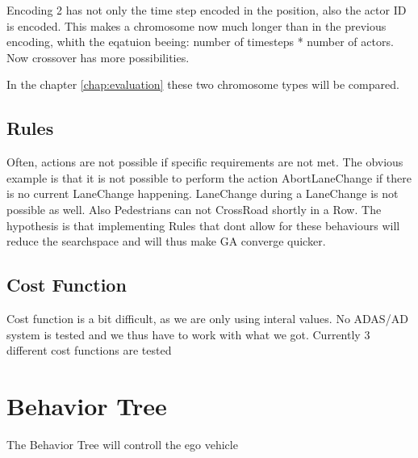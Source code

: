 Encoding 2 has not only the time step encoded in the position, also the actor ID is encoded. This makes a chromosome now much longer than in the previous encoding, whith the eqatuion beeing: number of timesteps * number of actors. Now crossover has more possibilities.

In the chapter \ref{chap:evaluation} these two chromosome types will be compared.

\subsection{Rules}
Often, actions are not possible if specific requirements are not met. The obvious example is that it is not possible to perform the action AbortLaneChange if there is no current LaneChange happening. LaneChange during a LaneChange is not possible as well. Also Pedestrians can not CrossRoad shortly in a Row.
The hypothesis is that implementing Rules that dont allow for these behaviours will reduce the searchspace and will thus make GA converge quicker.

\subsection{Cost Function}
Cost function is a bit difficult, as we are only using interal values. No ADAS/AD system is tested and we thus have to work with what we got.
Currently 3 different cost functions are tested


\section{Behavior Tree}
The Behavior Tree will controll the ego vehicle 



